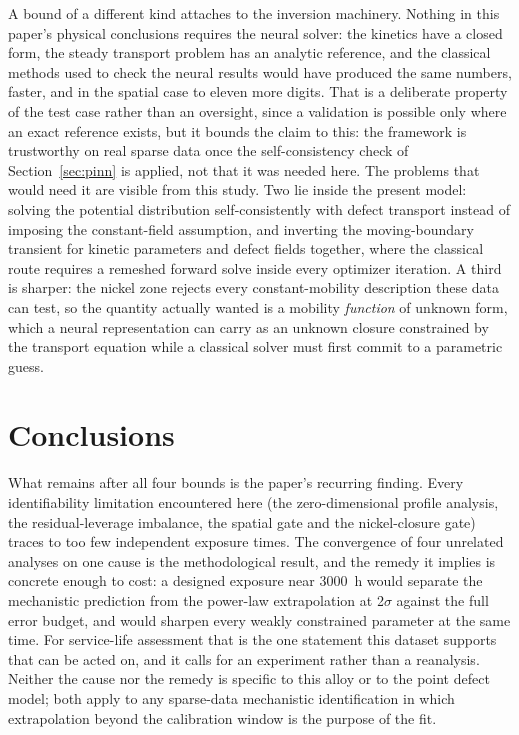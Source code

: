 \documentclass[a4paper,fleqn]{cas-sc}
\begin{document}
A bound of a different kind attaches to the inversion machinery. Nothing
in this paper's physical conclusions requires the neural solver: the
kinetics have a closed form, the steady transport problem has an
analytic reference, and the classical methods used to check the neural
results would have produced the same numbers, faster, and in the spatial
case to eleven more digits. That is a deliberate property of the test
case rather than an oversight, since a validation is possible only where
an exact reference exists, but it bounds the claim to this: the
framework is trustworthy on real sparse data once the self-consistency
check of Section~\ref{sec:pinn} is applied, not that it was needed here.
The problems that would need it are visible from this study. Two lie
inside the present model: solving the potential distribution
self-consistently with defect transport instead of imposing the
constant-field assumption, and inverting the moving-boundary transient
for kinetic parameters and defect fields together, where the classical
route requires a remeshed forward solve inside every optimizer
iteration. A third is sharper: the nickel zone rejects every
constant-mobility description these data can test, so the quantity
actually wanted is a mobility \emph{function} of unknown form, which a
neural representation can carry as an unknown closure constrained by the
transport equation while a classical solver must first commit to a
parametric guess.



\section{Conclusions}\label{sec:conclusions}

What remains after all four bounds is the paper's recurring finding.
Every identifiability limitation encountered here (the zero-dimensional
profile analysis, the residual-leverage imbalance, the spatial gate and
the nickel-closure gate) traces to too few independent exposure times.
The convergence of four unrelated analyses on one cause is the
methodological result, and the remedy it implies is concrete enough to
cost: a designed exposure near 3000~h would separate the mechanistic
prediction from the power-law extrapolation at 2$\sigma$ against the full
error budget, and would sharpen every weakly constrained parameter at the
same time. For service-life assessment that is the one statement
this dataset supports that can be acted on, and it calls for an
experiment rather than a reanalysis.
Neither the cause nor the remedy is specific to this alloy or to the
point defect model; both apply to any sparse-data mechanistic
identification in which extrapolation beyond the calibration window is
the purpose of the fit.
\end{document}
